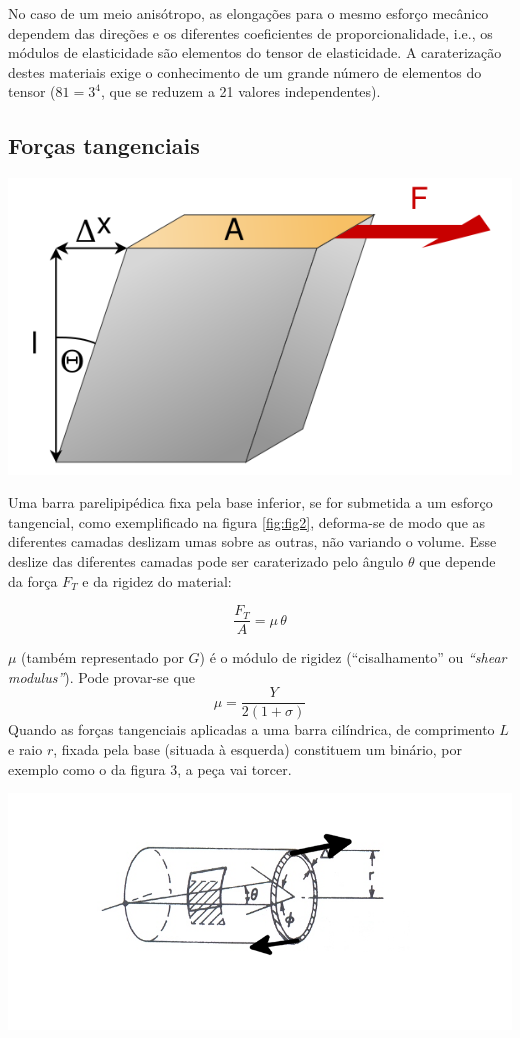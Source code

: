 \documentclass[a4paper,12pt]{article}
\begin{document}
No caso de um meio anisótropo, as elongações para o mesmo esforço mecânico dependem das direções e os diferentes coeficientes de proporcionalidade, i.e., os módulos de elasticidade são elementos do tensor de elasticidade. A caraterização destes materiais exige o conhecimento de um grande número de elementos do tensor ($81=3^4$, que se reduzem a 21 valores independentes).

\subsection{\sf Forças tangenciais }
\begin{center}
	\includegraphics[width=0.45\linewidth]{602px-Shear_scherung}
\end{center}
Uma barra parelipipédica fixa pela base inferior, se for submetida a um esforço tangencial, como exemplificado na figura \ref{fig:fig2}, deforma-se de modo que as diferentes camadas deslizam umas sobre as outras, não variando o volume. Esse deslize das diferentes camadas pode ser caraterizado pelo ângulo 
$\theta$ que depende da força $F_T$ e da rigidez do material:

\begin{equation}
	\label{eq:shear}
	 \frac{F_T}{A} = \mu \, \theta 
\end{equation}

$\mu$ (também representado por $G$) é o módulo de rigidez (“cisalhamento” ou \emph{“shear modulus”}). Pode provar-se que 
\begin{equation}
	\label{eq:mu}
	 \mu  = \frac{Y}{2(1 +\sigma )}
\end{equation}
Quando as forças tangenciais aplicadas a uma barra cilíndrica, de comprimento $L$ e raio $r$, fixada pela base (situada à esquerda) constituem um binário, por exemplo como o da figura 3, a peça vai torcer.

\begin{center}
	\includegraphics[width=0.5\linewidth]{rotac3}
\end{center}
\end{document}
